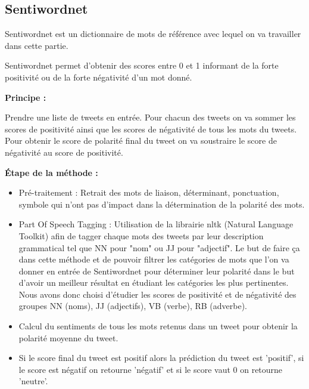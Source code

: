 \subsection{Sentiwordnet}
\par Sentiwordnet est un dictionnaire de mots de référence avec lequel on va travailler dans cette partie.
\par Sentiwordnet permet d'obtenir des scores entre 0 et 1 informant de la forte positivité ou de la forte négativité d'un mot donné. \\


\par \textbf{Principe :} \\
\par Prendre une liste de tweets en entrée. Pour chacun des tweets on va sommer les scores de positivité ainsi que les scores de négativité de tous les mots du tweets. Pour obtenir le score de polarité final du tweet on va soustraire le score de négativité au score de positivité. \\

\par \textbf{Étape de la méthode :} \\
\begin{itemize}
	\item Pré-traitement : Retrait des mots de liaison, déterminant, ponctuation, symbole qui n'ont pas d'impact dans la détermination de la polarité des mots.	 \\
	\item Part Of Speech Tagging : Utilisation de la librairie nltk (Natural Language Toolkit) afin de tagger chaque mots des tweets par leur description grammatical tel que NN pour "nom" ou JJ pour "adjectif". Le but de faire ça dans cette méthode et de pouvoir filtrer les catégories de mots que l'on va donner en entrée de Sentiwordnet pour déterminer leur polarité dans le but d'avoir un meilleur résultat en étudiant les catégories les plus pertinentes. Nous avons donc choisi d'étudier les scores de positivité et de négativité des groupes NN (noms), JJ (adjectifs), VB (verbe), RB (adverbe). \\
	\item Calcul du sentiments de tous les mots retenus dans un tweet pour obtenir la polarité moyenne du tweet. \\
	\item Si le score final du tweet est positif alors la prédiction du tweet est 'positif', si le score est négatif on retourne 'négatif' et si le score vaut 0 on retourne 'neutre'. \\
\end{itemize}

